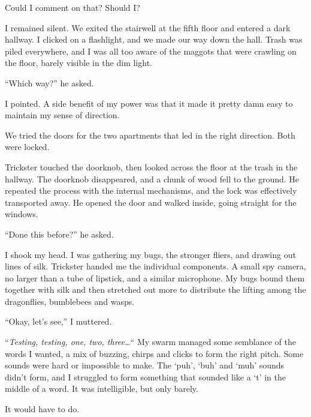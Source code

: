 Could I comment on that?  Should I?



I remained silent.  We exited the stairwell at the fifth floor and entered a dark hallway.  I clicked on a flashlight, and we made our way down the hall.  Trash was piled everywhere, and I was all too aware of the maggots that were crawling on the floor, barely visible in the dim light.



``Which way?'' he asked.



I pointed.  A side benefit of my power was that it made it pretty damn easy to maintain my sense of direction.



We tried the doors for the two apartments that led in the right direction.  Both were locked.



Trickster touched the doorknob, then looked across the floor at the trash in the hallway.  The doorknob disappeared, and a chunk of wood fell to the ground.  He repeated the process with the internal mechanisms, and the lock was effectively transported away.  He opened the door and walked inside, going straight for the windows.



``Done this before?'' he asked.



I shook my head.  I was gathering my bugs, the stronger fliers, and drawing out lines of silk.  Trickster handed me the individual components.  A small spy camera, no larger than a tube of lipstick, and a similar microphone.  My bugs bound them together with silk and then stretched out more to distribute the lifting among the dragonflies, bumblebees and wasps.



``Okay, let's see,'' I muttered.



``\emph{Testing, testing, one, two, three\ldots}``\emph{  }My swarm managed some semblance of the words I wanted, a mix of buzzing, chirps and clicks to form the right pitch.  Some sounds were hard or impossible to make.  The `puh', `buh' and `muh' sounds didn't form, and I struggled to form something that sounded like a `t' in the middle of a word.  It was intelligible, but only barely.



It would have to do.



